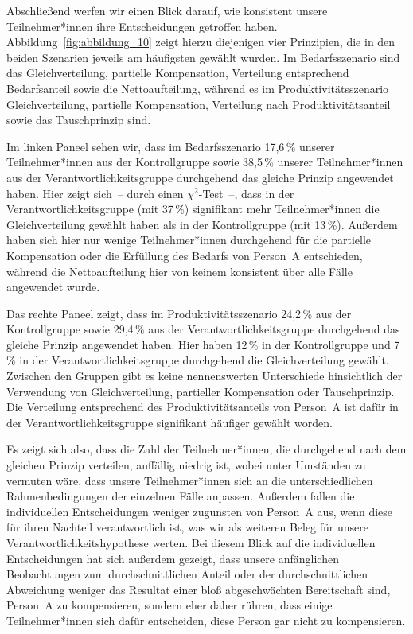 \documentclass[justified,nobib,symmetric,twoside]{tufte-handout}
\begin{document}
Abschließend werfen wir einen Blick darauf, wie konsistent unsere Teilnehmer*innen ihre Entscheidungen getroffen haben.
Abbildung~\ref{fig:abbildung_10} zeigt hierzu diejenigen vier Prinzipien, die in den beiden Szenarien jeweils am häufigsten gewählt wurden.
Im Bedarfsszenario sind das Gleichverteilung, partielle Kompensation, Verteilung entsprechend Bedarfsanteil sowie die Nettoaufteilung, während es im Produktivitätsszenario Gleichverteilung, partielle Kompensation, Verteilung nach Produktivitätsanteil sowie das Tauschprinzip sind.

Im linken Paneel sehen wir, dass im Bedarfsszenario 17,6\,\% unserer Teilnehmer*innen aus der Kontrollgruppe sowie 38,5\,\% unserer Teilnehmer*innen aus der Verantwortlichkeitsgruppe durchgehend das gleiche Prinzip angewendet haben.
Hier zeigt sich~-- durch einen $\chi^{\textrm{2}}$-Test~--, dass in der Verantwortlichkeitsgruppe (mit 37\,\%) signifikant mehr Teilnehmer*innen die Gleichverteilung gewählt haben als in der Kontrollgruppe (mit 13\,\%).
Außerdem haben sich hier nur wenige Teilnehmer*innen durchgehend für die partielle Kompensation oder die Erfüllung des Bedarfs von Person~A entschieden, während die Nettoaufteilung hier von keinem konsistent über alle Fälle angewendet wurde.

Das rechte Paneel zeigt, dass im Produktivitätsszenario 24,2\,\% aus der Kontrollgruppe sowie 29,4\,\% aus der Verantwortlichkeitsgruppe durchgehend das gleiche Prinzip angewendet haben.
Hier haben 12\,\% in der Kontrollgruppe und 7\,\% in der Verantwortlichkeitsgruppe durchgehend die Gleichverteilung gewählt.
Zwischen den Gruppen gibt es keine nennenswerten Unterschiede hinsichtlich der Verwendung von Gleichverteilung, partieller Kompensation oder Tauschprinzip.
Die Verteilung entsprechend des Produktivitätsanteils von Person~A ist dafür in der Verantwortlichkeitsgruppe signifikant häufiger gewählt worden.

Es zeigt sich also, dass die Zahl der Teilnehmer*innen, die durchgehend nach dem gleichen Prinzip verteilen, auffällig niedrig ist, wobei unter Umständen zu vermuten wäre, dass unsere Teilnehmer*innen sich an die unterschiedlichen Rahmenbedingungen der einzelnen Fälle anpassen.
Außerdem fallen die individuellen Entscheidungen weniger zugunsten von Person~A aus, wenn diese für ihren Nachteil verantwortlich ist, was wir als weiteren Beleg für unsere Verantwortlichkeitshypothese werten.
Bei diesem Blick auf die individuellen Entscheidungen hat sich außerdem gezeigt, dass unsere anfänglichen Beobachtungen zum durchschnittlichen Anteil oder der durchschnittlichen Abweichung weniger das Resultat einer bloß abgeschwächten Bereitschaft sind, Person~A zu kompensieren, sondern eher daher rühren, dass einige Teilnehmer*innen sich dafür entscheiden, diese Person gar nicht zu kompensieren.
\end{document}
